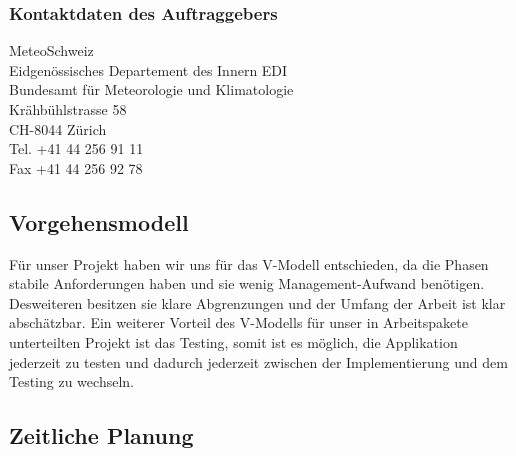 \documentclass[a4paper,10pt]{article}
\begin{document}
\subsubsection{Kontaktdaten des Auftraggebers}
MeteoSchweiz\\
Eidgenössisches Departement des Innern EDI \\
Bundesamt für Meteorologie und Klimatologie\\
Krähbühlstrasse 58\\
CH-8044 Zürich\\
Tel.   +41 44 256 91 11 \\
Fax   +41 44 256 92 78\\

\subsection{Vorgehensmodell}
Für unser Projekt haben wir uns für das V-Modell\cite{vmodell} entschieden, da die
Phasen stabile Anforderungen haben und sie wenig Management-Aufwand
benötigen. Desweiteren besitzen sie klare Abgrenzungen und der Umfang
der Arbeit ist klar abschätzbar. Ein weiterer Vorteil des V-Modells für unser 
in Arbeitspakete unterteilten Projekt ist das Testing, somit ist es möglich, die 
Applikation jederzeit zu testen und dadurch jederzeit zwischen 
der Implementierung und dem Testing zu wechseln.

\subsection{Zeitliche Planung}
\end{document}
